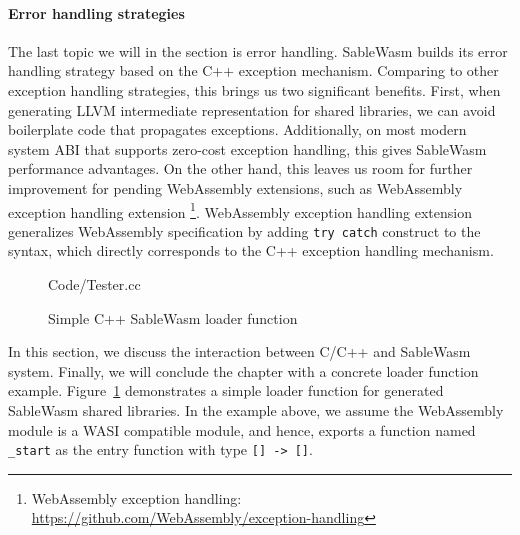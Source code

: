 \paragraph{Error handling strategies}

The last topic we will in the section is error handling. SableWasm builds its error handling strategy based on the C++ exception mechanism. Comparing to other exception handling strategies, this brings us two significant benefits. First, when generating LLVM intermediate representation for shared libraries, we can avoid boilerplate code that propagates exceptions. Additionally, on most modern system ABI that supports zero-cost exception handling, this gives SableWasm performance advantages.  On the other hand, this leaves us room for further improvement for pending WebAssembly extensions, such as WebAssembly exception handling extension \footnote{WebAssembly exception handling: \url{https://github.com/WebAssembly/exception-handling}}. WebAssembly exception handling extension generalizes WebAssembly specification by adding \texttt{try catch} construct to the syntax, which directly corresponds to the C++ exception handling mechanism.

\begin{figure}
    \centering
    
    {Code/Tester.cc}
    \caption{Simple C++ SableWasm loader function}
    \label{fig:sablewasm-loader}
\end{figure}

In this section, we discuss the interaction between C/C++ and SableWasm system. Finally, we will conclude the chapter with a concrete loader function example. Figure~\ref{fig:sablewasm-loader} demonstrates a simple loader function for generated SableWasm shared libraries. In the example above, we assume the WebAssembly module is a WASI compatible module, and hence, exports a function named \texttt{\_start} as the entry function with type \texttt{[] -> []}.
